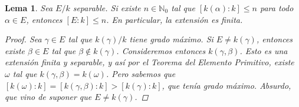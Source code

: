 \documentclass[12pt]{book}
\newtheorem{lem}[teo]{Lema}
\theoremstyle{definition}
\newcommand{\NN}{\mathbb{N}}
\begin{document}
\begin{lem}
Sea $E/k$ separable. Si existe $n\in\NN_0$ tal que $[k(\alpha):k]\leq n$ para todo $\alpha\in E$, entonces $[E:k]\leq n$. En particular, la extensión es finita.
\begin{proof}
Sea $\gamma\in E$ tal que $k(\gamma)/k$ tiene grado máximo. Si $E\neq k(\gamma)$, entonces existe $\beta\in E$ tal que $\beta\notin k(\gamma)$. Consideremos entonces $k(\gamma,\beta)$. Esto es una extensión finita y separable, y así por el Teorema del Elemento Primitivo, existe $\omega$ tal que $k(\gamma,\beta) = k(\omega)$. Pero sabemos que $[k(\omega):k] = [k(\gamma,\beta):k] > [k(\gamma):k]$, que tenía grado máximo. Absurdo, que vino de suponer que $E\neq k(\gamma)$.
\end{proof}
\end{lem}
\end{document}

